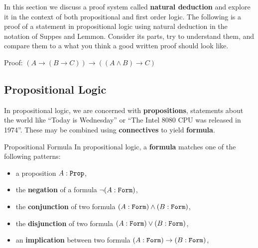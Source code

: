 
In this section we discuss a proof system called \textbf{natural deduction} and explore it in the context of both propositional and first order logic.
The following is a proof of a statement in propositional logic using natural deduction in the notation of Suppes and Lemmon.
Consider its parts, try to understand them, and compare them to a what you think a good written proof should look like.

\medskip

\begin{center}
	\begin{lproof}{Proof: $(A\to(B\to C)) \to ((A\land B)\to C)$}
		\hline
	\end{lproof}
\end{center}

\subsection{Propositional Logic}

In propositional logic, we are concerned with {\bf propositions}, statements about the world like ``Today is Wednesday'' or ``The Intel 8080 CPU was released in 1974''.
These may be combined using {\bf connectives} to yield {\bf formula}.

\begin{definition}{Propositional Formula}{}
	In propositional logic, a {\bf formula} matches one of the following patterns:
	\begin{itemize}[noitemsep, topsep=0pt]
		\item a proposition $A:\texttt{Prop}$,
		\item the {\bf negation} of a formula $\lnot (A:\texttt{Form})$,
		\item the {\bf conjunction} of two formula $(A:\texttt{Form}) \land (B:\texttt{Form})$,
		\item the {\bf disjunction} of two formula $(A:\texttt{Form}) \lor (B:\texttt{Form})$,
		\item an {\bf implication} between two formula $(A:\texttt{Form})\to(B:\texttt{Form})$,	
\end{itemize}
\end{definition}

